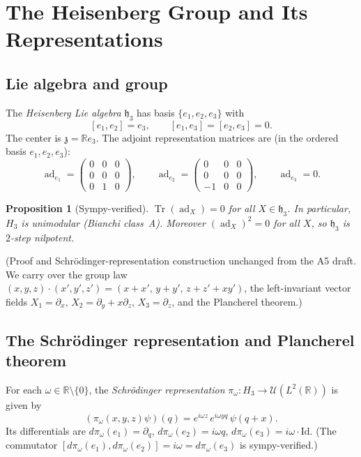 \documentclass[11pt, a4paper]{article}
\newtheorem{proposition}[theorem]{Proposition}
\newcommand{\RR}{\mathbb{R}}
\newcommand{\HH}{\mathfrak{h}}
\newcommand{\Hgroup}{H_3}
\newcommand{\piom}{\pi_\omega}
\newcommand{\dpiom}{d\pi_\omega}
\newcommand{\Tr}{\operatorname{Tr}}
\newcommand{\ad}{\operatorname{ad}}
\newcommand{\om}{\omega}
\begin{document}
\section{The Heisenberg Group and Its Representations}

\subsection{Lie algebra and group}

The \emph{Heisenberg Lie algebra} $\HH_3$ has basis $\{e_1, e_2, e_3\}$ with
\begin{equation}\label{eq:bracket}
  [e_1, e_2] = e_3, \qquad [e_1, e_3] = [e_2, e_3] = 0.
\end{equation}
The center is $\mathfrak{z} = \RR e_3$.
The adjoint representation matrices are (in the ordered basis $e_1, e_2, e_3$):
\begin{equation}
  \ad_{e_1} = \begin{pmatrix} 0&0&0\\ 0&0&0\\ 0&1&0 \end{pmatrix},
  \qquad
  \ad_{e_2} = \begin{pmatrix} 0&0&0\\ 0&0&0\\ -1&0&0 \end{pmatrix},
  \qquad
  \ad_{e_3} = 0.
\end{equation}

\begin{proposition}[Sympy-verified]\label{prop:unimod}
  $\Tr(\ad_X) = 0$ for all $X \in \HH_3$. In particular, $\Hgroup$ is unimodular
  (Bianchi class~A). Moreover $(\ad_X)^2 = 0$ for all $X$, so $\HH_3$ is
  $2$-step nilpotent.
\end{proposition}

\noindent (Proof and Schrödinger-representation construction unchanged from the
A5 draft. We carry over the group law
$(x,y,z)\cdot(x',y',z') = (x+x',\, y+y',\, z+z'+xy')$,
the left-invariant vector fields
$X_1=\partial_x,\, X_2=\partial_y + x\partial_z,\, X_3=\partial_z$,
and the Plancherel theorem.)

\subsection{The Schrödinger representation and Plancherel theorem}

For each $\om \in \RR \setminus \{0\}$, the \emph{Schrödinger representation}
$\piom: \Hgroup \to \mathcal{U}(L^2(\RR))$ is given by
\begin{equation}\label{eq:schrodinger_rep}
  (\piom(x,y,z)\psi)(q) = e^{i\om z}\, e^{i\om y q}\, \psi(q+x).
\end{equation}
Its differentials are $\dpiom(e_1)=\partial_q$, $\dpiom(e_2)=i\om q$,
$\dpiom(e_3)=i\om\cdot\mathrm{Id}$. (The commutator
$[\dpiom(e_1),\dpiom(e_2)]=i\om = \dpiom(e_3)$ is sympy-verified.)
\end{document}
